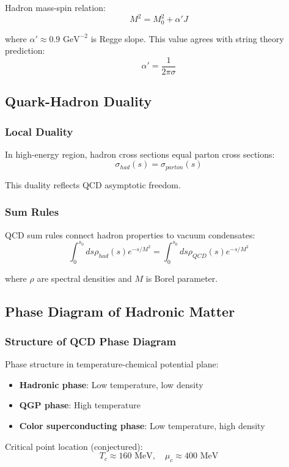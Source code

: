\documentclass[11pt]{article}
\begin{document}
Hadron mass-spin relation:
$$M^2 = M_0^2 + \alpha' J$$

where $\alpha' \approx 0.9 \text{ GeV}^{-2}$ is Regge slope. This value agrees with string theory prediction:
$$\alpha' = \frac{1}{2\pi \sigma}$$

\subsection{Quark-Hadron Duality}

\subsubsection{Local Duality}

In high-energy region, hadron cross sections equal parton cross sections:
$$\sigma_{had}(s) = \sigma_{parton}(s)$$

This duality reflects QCD asymptotic freedom.

\subsubsection{Sum Rules}

QCD sum rules connect hadron properties to vacuum condensates:
$$\int_0^{s_0} ds \rho_{had}(s) e^{-s/M^2} = \int_0^{s_0} ds \rho_{QCD}(s) e^{-s/M^2}$$

where $\rho$ are spectral densities and $M$ is Borel parameter.

\subsection{Phase Diagram of Hadronic Matter}

\subsubsection{Structure of QCD Phase Diagram}

Phase structure in temperature-chemical potential plane:
\begin{itemize}
\item \textbf{Hadronic phase}: Low temperature, low density
\item \textbf{QGP phase}: High temperature
\item \textbf{Color superconducting phase}: Low temperature, high density
\end{itemize}

Critical point location (conjectured):
$$T_c \approx 160 \text{ MeV}, \quad \mu_c \approx 400 \text{ MeV}$$
\end{document}

